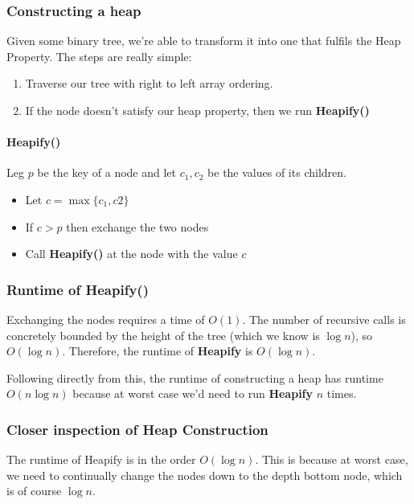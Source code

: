 \documentclass[11pt,a4paper,titlepage,dvipsnames,cmyk]{scrartcl}
\begin{document}
\subsubsection{Constructing a heap}%
\label{ssub:Constructing a heap}
Given some binary tree, we're able to transform it into one that fulfils
the Heap Property. The steps are really simple:

\begin{enumerate}
    \item Traverse our tree with right to left array ordering.
    \item If the node doesn't satisfy our heap property, then we run
        \textbf{Heapify()} 
\end{enumerate}

\paragraph{Heapify()}%
\label{par:Heapify()}
Leg $p$ be the key of a node and let $c_1, c_2$ be the values of its
children.
\begin{itemize}
    \item Let $c = \max\{c_1,c2\}$
    \item If $c > p$ then exchange the two nodes
    \item Call \textbf{Heapify()} at the node with the value $c$
\end{itemize}

\subsubsection{Runtime of Heapify()}%
\label{ssub:Runtime of Heapify()}
Exchanging the nodes requires a time of $O(1)$. The number of recursive
calls is concretely bounded by the height of the tree (which we know is
$\log n$), so $O(\log n)$. Therefore, the runtime of \textbf{Heapify} is
$O(\log n)$.

Following directly from this, the runtime of constructing a heap has
runtime $O(n \log n)$ because at worst case we'd need to run
\textbf{Heapify} $n$ times.

\subsubsection{Closer inspection of Heap Construction}%
\label{ssub:Closer inspection of Heap Construction}
The runtime of Heapify is in the order $O(\log n)$. This is because at
worst case, we need to continually change the nodes down to the depth bottom
node, which is of course $\log n$.
\end{document}
